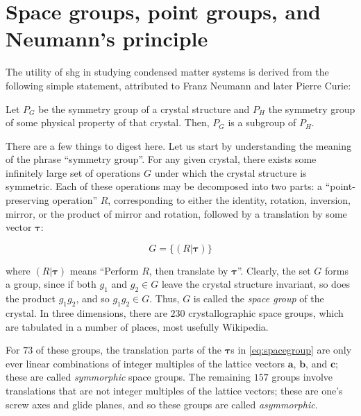 \section{Space groups, point groups, and Neumann's principle}

The utility of \gls{shg} in studying condensed matter systems is derived from the following simple statement, attributed to Franz Neumann\cite{neumann_vorlesungen_1885} and later Pierre Curie\cite{curie_sur_1894}:

\begin{theorem}\label{thm:neumann}
Let $P_G$ be the symmetry group of a crystal structure and $P_H$ the symmetry group of some physical property of that crystal.
Then, $P_G$ is a subgroup of $P_H$.
\end{theorem}

There are a few things to digest here.
Let us start by understanding the meaning of the phrase ``symmetry group''.
For any given crystal, there exists some infinitely large set of operations $G$ under which the crystal structure is symmetric.
Each of these operations may be decomposed into two parts: a ``point-preserving operation'' $R$, corresponding to either the identity, rotation, inversion, mirror, or the product of mirror and rotation, followed by a translation by some vector $\bm{\tau}$:

\begin{equation}\label{eq:spacegroup}
G = \{(R|\bm{\tau})\}
\end{equation}

where $(R|\bm{\tau})$ means ``Perform $R$, then translate by $\bm{\tau}$''.
Clearly, the set $G$ forms a group, since if both $g_1$ and $g_2 \in G$ leave the crystal structure invariant, so does the product $g_1g_2$, and so $g_1g_2 \in G$.
Thus, $G$ is called the \emph{space group} of the crystal.
In three dimensions, there are $230$ crystallographic space groups, which are tabulated in a number of places, most usefully Wikipedia\cite{wiki:spacegroups}.

For $73$ of these groups, the translation parts of the $\bm{\tau}$s in \cref{eq:spacegroup} are only ever linear combinations of integer multiples of the lattice vectors $\bm{a}$, $\bm{b}$, and $\bm{c}$; these are called \emph{symmorphic} space groups.
The remaining $157$ groups involve translations that are not integer multiples of the lattice vectors; these are one's screw axes and glide planes, and so these groups are called \emph{asymmorphic}.

